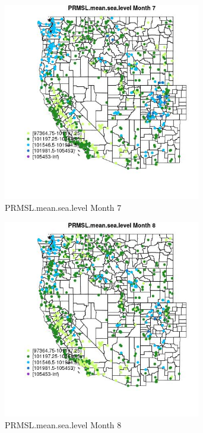 \begin{figure} 
\centering  
\includegraphics[width=0.77\textwidth]{Code_Outputs/Report_ML_input_PM25_Step4_part_e_de_duplicated_aves_compiled_2019-05-21wNAs_MapObsMo7PRMSLmeansealevel.jpg} 
\caption{\label{fig:Report_ML_input_PM25_Step4_part_e_de_duplicated_aves_compiled_2019-05-21wNAsMapObsMo7PRMSLmeansealevel}PRMSL.mean.sea.level Month 7} 
\end{figure} 
 

\begin{figure} 
\centering  
\includegraphics[width=0.77\textwidth]{Code_Outputs/Report_ML_input_PM25_Step4_part_e_de_duplicated_aves_compiled_2019-05-21wNAs_MapObsMo8PRMSLmeansealevel.jpg} 
\caption{\label{fig:Report_ML_input_PM25_Step4_part_e_de_duplicated_aves_compiled_2019-05-21wNAsMapObsMo8PRMSLmeansealevel}PRMSL.mean.sea.level Month 8} 
\end{figure} 
 

